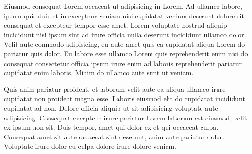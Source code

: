 Eiusmod consequat Lorem occaecat ut adipisicing in Lorem. Ad ullamco labore, ipsum quis duis et in excepteur veniam nisi cupidatat veniam deserunt dolore sit consequat et excepteur tempor esse amet. Lorem voluptate nostrud aliquip incididunt nisi ipsum sint ad irure officia nulla deserunt incididunt ullamco dolor. Velit aute commodo adipisicing, eu aute amet quis ea cupidatat aliqua Lorem do pariatur quis dolor. Eu labore esse ullamco Lorem quis reprehenderit enim nisi do consequat consectetur officia ipsum irure enim ad laboris reprehenderit pariatur cupidatat enim laboris. Minim do ullamco aute sunt ut veniam.

Quis anim pariatur proident, et laborum velit aute ea aliqua ullamco irure cupidatat non proident magna esse. Laboris eiusmod elit do cupidatat incididunt cupidatat ad non. Dolore officia aliquip ut sit adipisicing voluptate aute adipisicing. Consequat excepteur irure pariatur Lorem laborum est eiusmod, velit ex ipsum non sit. Duis tempor, amet qui dolor ex et qui occaecat culpa. Consequat amet sit aute occaecat sint deserunt, anim aute pariatur dolor. Voluptate irure dolor eu culpa dolore irure dolore veniam.